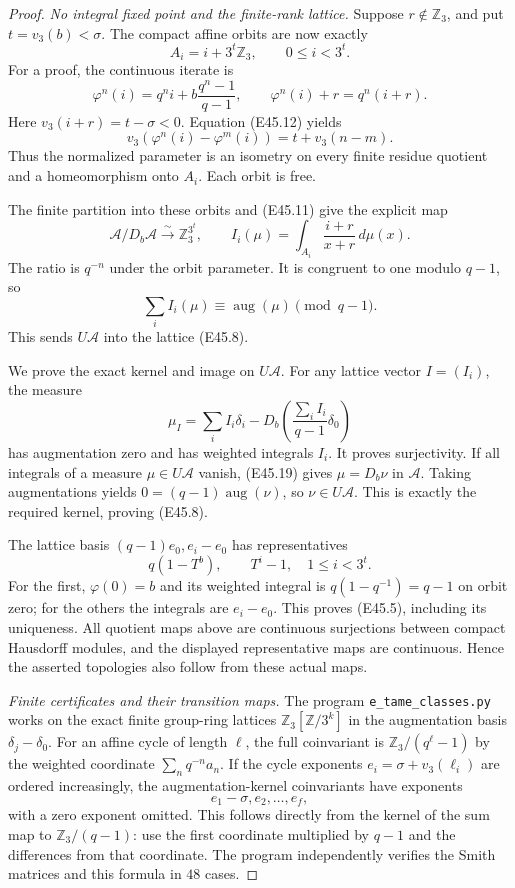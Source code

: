 \begin{proof}
\emph{No integral fixed point and the finite-rank lattice.}
Suppose $r\notin\mathbb Z_3$,
and put $t=v_3(b)<\sigma$.
The compact affine orbits are
now exactly
\[
 A_i=i+3^t\mathbb Z_3,
                  \qquad0\le i<3^t.
 \tag{E45.18}
\]
For a proof, the continuous
iterate is
\[
 \varphi^n(i)=q^ni+
                   b\frac{q^n-1}{q-1},\qquad
 \varphi^n(i)+r=q^n(i+r).
\]
Here $v_3(i+r)=t-\sigma<0$.
Equation (E45.12) yields
\[
 v_3(\varphi^n(i)-\varphi^m(i))
                         =t+v_3(n-m).
\]
Thus the normalized parameter
is an isometry on every
finite residue quotient and
a homeomorphism onto $A_i$.
Each orbit is free.

The finite partition into
these orbits and (E45.11)
give the explicit map
\[
 \mathscr A/D_b\mathscr A\xrightarrow{\sim}
     \mathbb Z_3^{3^t},\qquad
 I_i(\mu)=\int_{A_i}\frac{i+r}{x+r}\,d\mu(x).
 \tag{E45.19}
\]
The ratio is $q^{-n}$ under
the orbit parameter. It is
congruent to one modulo
$q-1$, so
\[
             \sum_i I_i(\mu)
                         \equiv\operatorname{aug}(\mu)
                                      \pmod{q-1}.
 \tag{E45.20}
\]
This sends $U\mathscr A$ into
the lattice (E45.8).

We prove the exact kernel
and image on $U\mathscr A$.
For any lattice vector
$I=(I_i)$, the measure
\[
 \mu_I=\sum_i I_i\delta_i
       -D_b\left(\frac{\sum_iI_i}{q-1}\delta_0\right)
 \tag{E45.21}
\]
has augmentation zero and
has weighted integrals $I_i$.
It proves surjectivity. If
all integrals of a measure
$\mu\in U\mathscr A$ vanish,
(E45.19) gives $\mu=D_b\nu$
in $\mathscr A$. Taking
augmentations yields
$0=(q-1)\operatorname{aug}(\nu)$,
so $\nu\in U\mathscr A$.
This is exactly the required
kernel, proving (E45.8).

The lattice basis
$(q-1)e_0,e_i-e_0$ has
representatives
\[
 q(1-T^b),\qquad T^i-1,
                     \quad1\le i<3^t.
\]
For the first, $\varphi(0)=b$
and its weighted integral is
$q(1-q^{-1})=q-1$ on orbit
zero; for the others the
integrals are $e_i-e_0$.
This proves (E45.5), including
its uniqueness. All quotient
maps above are continuous
surjections between compact
Hausdorff modules, and the
displayed representative
maps are continuous. Hence
the asserted topologies also
follow from these actual maps.

\emph{Finite certificates and their transition maps.}
The program
\texttt{e\_tame\_classes.py}
works on the exact finite
group-ring lattices
$\mathbb Z_3[\mathbb Z/3^k]$
in the augmentation basis
$\delta_j-\delta_0$.
For an affine cycle of
length $\ell$, the full
coinvariant is
$\mathbb Z_3/(q^\ell-1)$
by the weighted coordinate
$\sum_nq^{-n}a_n$.
If the cycle exponents
$e_i=\sigma+v_3(\ell_i)$
are ordered increasingly,
the augmentation-kernel
coinvariants have exponents
\[
 e_1-\sigma,e_2,\ldots,e_f,
 \tag{E45.22}
\]
with a zero exponent omitted.
This follows directly from
the kernel of the sum map
to $\mathbb Z_3/(q-1)$:
use the first coordinate
multiplied by $q-1$ and
the differences from that
coordinate. The program
independently verifies the
Smith matrices and this
formula in $48$ cases.


\end{proof}
